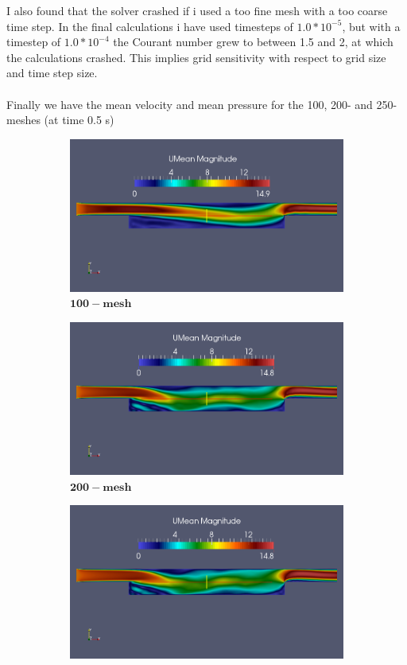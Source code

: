 \documentclass[a4paper,english,12pt,twoside]{article}
\begin{document}
\newpage
I also found that the solver crashed if i used a too fine mesh with a too coarse time step. In the final calculations i have used timesteps of $1.0*10^{-5}$, but with a timestep of $1.0*10^{-4}$ the Courant number grew to between 1.5 and 2, at which the calculations crashed. This implies grid sensitivity with respect to grid size and time step size.\\
\\
Finally we have the mean velocity and mean pressure for the 100, 200- and 250-meshes (at time 0.5 s)\\
\begin{figure}[h!]
	\begin{subfigure}{0.3\textwidth}
		\includegraphics[width=0.95\linewidth]{piso_10_filteredLinear_mean_u.png}
		\caption{$\mathbf{100-mesh}$}
	\end{subfigure}
	\begin{subfigure}{0.3\textwidth}
		\includegraphics[width=0.95\linewidth]{piso_20_filteredLinear_mean_u.png}
		\caption{$\mathbf{200-mesh}$}
	\end{subfigure}
	\begin{subfigure}{0.3\textwidth}
		\includegraphics[width=0.95\linewidth]{piso_25_filteredLinear_mean_u.png}

\end{subfigure}
\end{figure}
\end{document}
